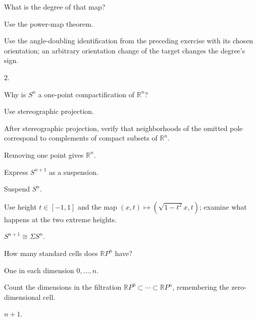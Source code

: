 \begin{exercise}\label{exr:viii04-17}
What is the degree of that map?
\end{exercise}
\begin{hint}
Use the power-map theorem.

Use the angle-doubling identification from the preceding exercise with its chosen orientation; an arbitrary orientation change of the target changes the degree's sign.
\end{hint}
\begin{solution}
\(2\).
\end{solution}

\begin{exercise}\label{exr:viii04-18}
Why is \(S^n\) a one-point compactification of \(\mathbb R^n\)?
\end{exercise}
\begin{hint}
Use stereographic projection.

After stereographic projection, verify that neighborhoods of the omitted pole correspond to complements of compact subsets of \(\mathbb R^n\).
\end{hint}
\begin{solution}
Removing one point gives \(\mathbb R^n\).
\end{solution}

\begin{exercise}\label{exr:viii04-19}
Express \(S^{n+1}\) as a suspension.
\end{exercise}
\begin{hint}
Suspend \(S^n\).

Use height \(t\in[-1,1]\) and the map \((x,t)\mapsto(\sqrt{1-t^2}x,t)\); examine what happens at the two extreme heights.
\end{hint}
\begin{solution}
\(S^{n+1}\cong\Sigma S^n\).
\end{solution}

\begin{exercise}\label{exr:viii04-20}
How many standard cells does \(\mathbb RP^n\) have?
\end{exercise}
\begin{hint}
One in each dimension \(0,\dots,n\).

Count the dimensions in the filtration \(\mathbb RP^0\subset\cdots\subset\mathbb RP^n\), remembering the zero-dimensional cell.
\end{hint}
\begin{solution}
\(n+1\).
\end{solution}

